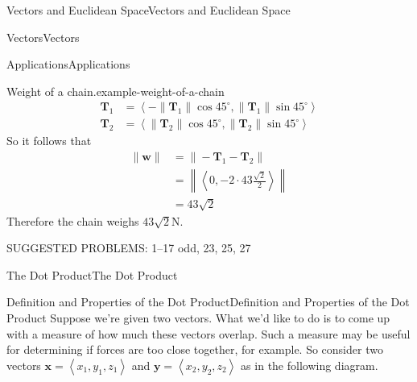 \documentclass[10pt,]{book}
\numberwithin{equation}{section}
\newcommand{\vv}[1]{\mathbf{#1}}
\newcommand{\dotprod}[1]{\left\langle #1 \right\rangle}
\begin{document}
\begin{chapterptx}{Vectors and Euclidean Space}{}{Vectors and Euclidean Space}{}{}
\begin{sectionptx}{Vectors}{}{Vectors}{}{}
\begin{subsectionptx}{Applications}{}{Applications}{}{}
\begin{example}{Weight of a chain.}{example-weight-of-a-chain}
%
\begin{align*}
\vv{T}_{1} & = \dotprod{-\|\vv{T}_{1}\|\cos45^{\circ},\|\vv{T}_{1}\|\sin45^{\circ}} \\
\vv{T}_{2} & = \dotprod{\|\vv{T}_{2}\|\cos45^{\circ},\|\vv{T}_{2}\|\sin45^{\circ}} 
\end{align*}
\hypertarget{p-905}{}%
So it follows that%
%
\begin{align*}
\|\vv{w}\| & = \|-\vv{T}_{1}-\vv{T}_{2}\| \\
& = \left\|\dotprod{0,-2\cdot43\frac{\sqrt{2}}{2}}\right\|\\
& = 43\sqrt{2} 
\end{align*}
\hypertarget{p-906}{}%
Therefore the chain weighs \(43\sqrt{2}\)\si{\newton}.%
\end{example}
\hypertarget{p-907}{}%
SUGGESTED PROBLEMS: 1--17 odd, 23, 25, 27%
\end{subsectionptx}
\end{sectionptx}
%
%
\typeout{************************************************}
\typeout{************************************************}
%
\begin{sectionptx}{The Dot Product}{}{The Dot Product}{}{}\label{section-the-dot-product}
%
%
\typeout{************************************************}
\typeout{************************************************}
%
\begin{subsectionptx}{Definition and Properties of the Dot Product}{}{Definition and Properties of the Dot Product}{}{}\label{subsection-definition-and-properties-of-the-dot-product}
\hypertarget{p-908}{}%
Suppose we're given two vectors. What we'd like to do is to come up with a measure of how much these vectors overlap. Such a measure may be useful for determining if forces are too close together, for example. So consider two vectors \(\vv{x} = \dotprod{x_{1},y_{1},z_{1}}\) and \(\vv{y} = \dotprod{x_{2},y_{2},z_{2}}\) as in the following diagram.%
\begin{figure}
\centering
{
}
\end{figure}
\end{subsectionptx}
\end{sectionptx}
\end{chapterptx}
\end{document}
